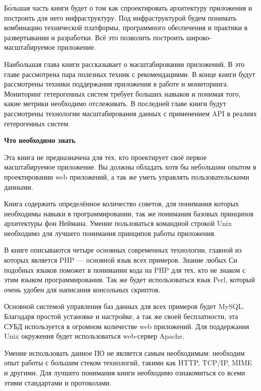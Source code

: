 Б\'{о}льшая часть книги будет о том как спроектировать архитектуру приложения и построить для него инфраструктуру. Под инфраструктурой будем понимать  комбинацию технической платформы, программного обеспечения и практики в развертывании и разработки. Всё это позволить построить широко-масштабируемое приложение.

Наибольшая глава книги рассказывает о масштабировании приложений.  В это главе рассмотрена пара полезных техник с рекомендациями. В конце книги будут рассмотрены техники поддержания приложения в работе и мониторинга. Мониторинг гетерогенных систем требует больших навыков и понимая того, какие метрики необходимо отслеживать. В последней главе книги будут рассмотрены  технологии масштабирования данных с применением API в реалиях гетерогенных систем.

\textbf{Что необходимо знать}

Эта книга не предназначена для тех, кто проектирует своё первое масштабируемое приложение. Вы должны обладать хотя бы небольшим опытом в проектировании web приложений, а так же уметь управлять пользовательскими данными.


Книга содержить определённое количество советов, для понимания которых необходимы навыки в программировании, так же понимания базовых принципов архитектуры фон Неймана. Умение пользоваться командной строкой Unix необходимо для лучшего понимания принципов работы приложения. 

В книге описываются четыре основных современных технологии, главной из которых является PHP --- основной язык всех примеров. Знание любых Си подобных языков поможет в понимании кода на PHP для тех, кто не знаком с этим языком программирования. Так же будет использоваться язык Perl, который очень удобен для написания  консольных скриптов.


Основной системой управления баз данных для всех примеров будет MySQL. Благодаря простой установке и настройке, а так же своей бесплатности, эта СУБД используется в огромном количестве web приложений. Для поддержания Unix окружения будет использоваться web-сервер Apache.

Умение использовать данное ПО не является самым необходимым: необходим опыт работы с большим стеком технологий, такими как HTTP, TCP/IP, MIME и другими. Для лучшего понимания книги необходимо ознакомиться со всеми этими стандартами и протоколами.


